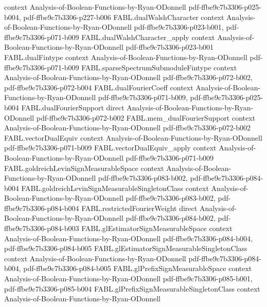 \begin{theorem}
  {context}
  {Analysis-of-Boolean-Functions-by-Ryan-ODonnell}
  {pdf-ffbe9c7b3306-p025-b004,
    pdf-ffbe9c7b3306-p227-b006}
\proofstep
  {FABL.dualWalshCharacter}
  {context}
  {Analysis-of-Boolean-Functions-by-Ryan-ODonnell}
  {pdf-ffbe9c7b3306-p023-b001,
    pdf-ffbe9c7b3306-p071-b009}
\proofstep
  {FABL.dualWalshCharacter_apply}
  {context}
  {Analysis-of-Boolean-Functions-by-Ryan-ODonnell}
  {pdf-ffbe9c7b3306-p023-b001}
\proofstep
  {FABL.dualFintype}
  {context}
  {Analysis-of-Boolean-Functions-by-Ryan-ODonnell}
  {pdf-ffbe9c7b3306-p071-b009}
\proofstep
  {FABL.sparseSpectrumSubmoduleFintype}
  {context}
  {Analysis-of-Boolean-Functions-by-Ryan-ODonnell}
  {pdf-ffbe9c7b3306-p072-b002,
    pdf-ffbe9c7b3306-p072-b004}
\proofstep
  {FABL.dualFourierCoeff}
  {context}
  {Analysis-of-Boolean-Functions-by-Ryan-ODonnell}
  {pdf-ffbe9c7b3306-p071-b009,
    pdf-ffbe9c7b3306-p025-b004}
\proofstep
  {FABL.dualFourierSupport}
  {direct}
  {Analysis-of-Boolean-Functions-by-Ryan-ODonnell}
  {pdf-ffbe9c7b3306-p072-b002}
\proofstep
  {FABL.mem_dualFourierSupport}
  {context}
  {Analysis-of-Boolean-Functions-by-Ryan-ODonnell}
  {pdf-ffbe9c7b3306-p072-b002}
\proofstep
  {FABL.vectorDualEquiv}
  {context}
  {Analysis-of-Boolean-Functions-by-Ryan-ODonnell}
  {pdf-ffbe9c7b3306-p071-b009}
\proofstep
  {FABL.vectorDualEquiv_apply}
  {context}
  {Analysis-of-Boolean-Functions-by-Ryan-ODonnell}
  {pdf-ffbe9c7b3306-p071-b009}
\proofstep
  {FABL.goldreichLevinSignMeasurableSpace}
  {context}
  {Analysis-of-Boolean-Functions-by-Ryan-ODonnell}
  {pdf-ffbe9c7b3306-p083-b002,
    pdf-ffbe9c7b3306-p084-b004}
\proofstep
  {FABL.goldreichLevinSignMeasurableSingletonClass}
  {context}
  {Analysis-of-Boolean-Functions-by-Ryan-ODonnell}
  {pdf-ffbe9c7b3306-p083-b002,
    pdf-ffbe9c7b3306-p084-b004}
\proofstep
  {FABL.restrictedFourierWeight}
  {direct}
  {Analysis-of-Boolean-Functions-by-Ryan-ODonnell}
  {pdf-ffbe9c7b3306-p084-b002,
    pdf-ffbe9c7b3306-p084-b003}
\proofstep
  {FABL.glEstimatorSignMeasurableSpace}
  {context}
  {Analysis-of-Boolean-Functions-by-Ryan-ODonnell}
  {pdf-ffbe9c7b3306-p084-b004,
    pdf-ffbe9c7b3306-p084-b005}
\proofstep
  {FABL.glEstimatorSignMeasurableSingletonClass}
  {context}
  {Analysis-of-Boolean-Functions-by-Ryan-ODonnell}
  {pdf-ffbe9c7b3306-p084-b004,
    pdf-ffbe9c7b3306-p084-b005}
\proofstep
  {FABL.glPrefixSignMeasurableSpace}
  {context}
  {Analysis-of-Boolean-Functions-by-Ryan-ODonnell}
  {pdf-ffbe9c7b3306-p085-b001,
    pdf-ffbe9c7b3306-p085-b004}
\proofstep
  {FABL.glPrefixSignMeasurableSingletonClass}
  {context}
  {Analysis-of-Boolean-Functions-by-Ryan-ODonnell}

\end{theorem}
